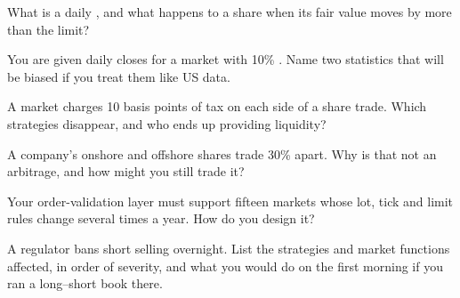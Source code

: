 \begin{interviewq}\label{iq:m1:asian-and-emerging-equity-markets:1}
What is a daily , and what happens to a share when its fair value
moves by more than the limit?
\end{interviewq}

\begin{interviewq}\label{iq:m1:asian-and-emerging-equity-markets:2}
You are given daily closes for a market with 10\% . Name two
statistics that will be biased if you treat them like US data.
\end{interviewq}

\begin{interviewq}\label{iq:m1:asian-and-emerging-equity-markets:3}
A market charges 10 basis points of tax on each side of a share trade. Which
strategies disappear, and who ends up providing liquidity?
\end{interviewq}

\begin{interviewq}\label{iq:m1:asian-and-emerging-equity-markets:4}
A company's onshore and offshore shares trade 30\% apart. Why is that not an
arbitrage, and how might you still trade it?
\end{interviewq}

\begin{interviewq}\label{iq:m1:asian-and-emerging-equity-markets:5}
Your order-validation layer must support fifteen markets whose lot, tick and
limit rules change several times a year. How do you design it?
\end{interviewq}

\begin{interviewq}\label{iq:m1:asian-and-emerging-equity-markets:6}
A regulator bans short selling overnight. List the strategies and market
functions affected, in order of severity, and what you would do on the first
morning if you ran a long--short book there.
\end{interviewq}
